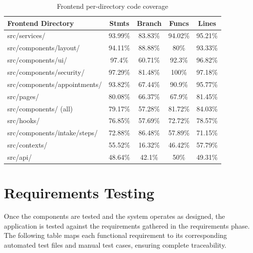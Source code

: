 \documentclass[12pt,letterpaper]{article}
\begin{document}
\begin{table}[!htbp]
\centering
\small
\begin{tabularx}{\textwidth}{|>{\raggedright\arraybackslash}p{5cm}|c|c|c|c|}
\hline
\rowcolor{TableHeader}\textcolor{TableHeaderText}{\textbf{Frontend Directory}} & \textcolor{TableHeaderText}{\textbf{Stmts}} & \textcolor{TableHeaderText}{\textbf{Branch}} & \textcolor{TableHeaderText}{\textbf{Funcs}} & \textcolor{TableHeaderText}{\textbf{Lines}} \\
\hline
src/services/ & 93.99\% & 83.83\% & 94.02\% & 95.21\% \\
\hline
\rowcolor{TableRowAlt}
src/components/layout/ & 94.11\% & 88.88\% & 80\% & 93.33\% \\
\hline
src/components/ui/ & 97.4\% & 60.71\% & 92.3\% & 96.82\% \\
\hline
\rowcolor{TableRowAlt}
src/components/security/ & 97.29\% & 81.48\% & 100\% & 97.18\% \\
\hline
src/components/appointments/ & 93.82\% & 67.44\% & 90.9\% & 95.77\% \\
\hline
\rowcolor{TableRowAlt}
src/pages/ & 80.08\% & 66.37\% & 67.9\% & 81.45\% \\
\hline
src/components/ (all) & 79.17\% & 57.28\% & 81.72\% & 84.03\% \\
\hline
\rowcolor{TableRowAlt}
src/hooks/ & 76.85\% & 57.69\% & 72.72\% & 78.57\% \\
\hline
src/components/intake/steps/ & 72.88\% & 86.48\% & 57.89\% & 71.15\% \\
\hline
\rowcolor{TableRowAlt}
src/contexts/ & 55.52\% & 16.32\% & 46.42\% & 57.79\% \\
\hline
src/api/ & 48.64\% & 42.1\% & 50\% & 49.31\% \\
\hline
\end{tabularx}
\caption{Frontend per-directory code coverage}
\end{table}

\section{Requirements Testing}

Once the components are tested and the system operates as designed, the application is tested against the requirements gathered in the requirements phase. The following table maps each functional requirement to its corresponding automated test files and manual test cases, ensuring complete traceability.
\end{document}
